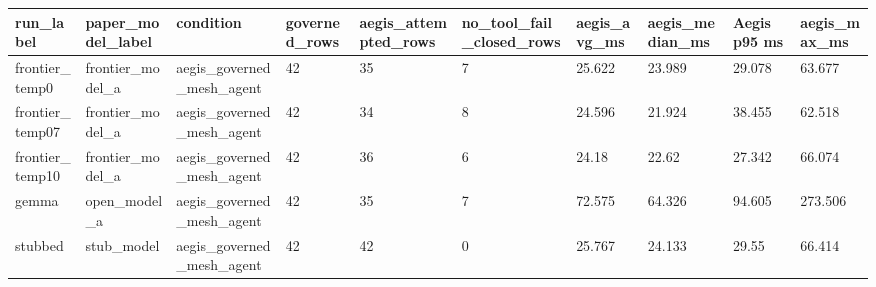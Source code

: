 \begin{tabular}{llllllllll}
 \hline
run\_label & paper\_model\_label & condition & governed\_rows & aegis\_attempted\_rows & no\_tool\_fail\_closed\_rows & aegis\_avg\_ms & aegis\_median\_ms & Aegis p95 ms & aegis\_max\_ms \\
 \hline
frontier\_temp0 & frontier\_model\_a & aegis\_governed\_mesh\_agent & 42 & 35 & 7 & 25.622 & 23.989 & 29.078 & 63.677 \\
frontier\_temp07 & frontier\_model\_a & aegis\_governed\_mesh\_agent & 42 & 34 & 8 & 24.596 & 21.924 & 38.455 & 62.518 \\
frontier\_temp10 & frontier\_model\_a & aegis\_governed\_mesh\_agent & 42 & 36 & 6 & 24.18 & 22.62 & 27.342 & 66.074 \\
gemma & open\_model\_a & aegis\_governed\_mesh\_agent & 42 & 35 & 7 & 72.575 & 64.326 & 94.605 & 273.506 \\
stubbed & stub\_model & aegis\_governed\_mesh\_agent & 42 & 42 & 0 & 25.767 & 24.133 & 29.55 & 66.414 \\
 \hline
\end{tabular}
